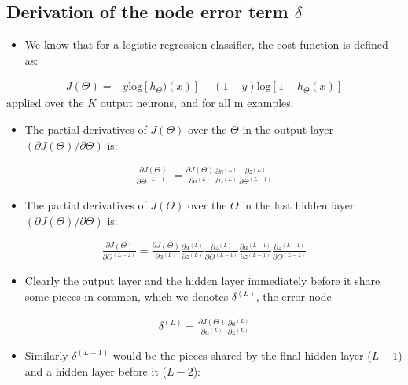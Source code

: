 \documentclass[a4paper,12pt]{report}
\begin{document}
\begin{appendices}
\section{Derivation of the node error term $\delta$}
\begin{itemize}
\item We know that for a logistic regression classifier, the cost function is defined as:
\end{itemize}
\begin{align}
J(\Theta) = -y \mathrm{log}[h_{\Theta})(x)] - (1-y)\mathrm{log}[1- h_{\Theta}(x)]
\end{align}
applied over the $K$ output neurons, and for all m examples.
\begin{itemize}
\item The partial derivatives of $J(\Theta)$ over the $\Theta$ in the output layer $(\partial J(\Theta) / \partial \Theta)$ is:
\end{itemize}
\begin{align}
\frac{\partial J(\Theta)}{\partial \Theta^{(L-1)}} = \frac{\partial J(\Theta)}{\partial a^{(L)}}\frac{\partial a^{(L)}}{\partial z^{(L)}} \frac{\partial z^{(L)}}{\partial \Theta^{(L-1)}}
\end{align}
\begin{itemize}
\item The partial derivatives of $J(\Theta)$ over the $\Theta$ in the last hidden layer $(\partial J(\Theta) / \partial \Theta)$ is:
\end{itemize}
\begin{align}
\frac{\partial J(\Theta)}{\partial \Theta^{(L-2)}} = \frac{\partial J(\Theta)}{\partial a^{(L)}}\frac{\partial a^{(L)}}{\partial z^{(L)}} \frac{\partial z^{(L)}}{\partial \Theta^{(L-1)}}\frac{\partial a^{(L-1)}}{\partial z^{(L-1)}}\frac{\partial z^{(L-1)}}{\partial \Theta^{(L-2)}}
\end{align}
\begin{itemize}
\item Clearly the output layer and the hidden layer immediately before it share some pieces in common, which we denotes $\delta ^{(L)}$, the error node
\end{itemize}
\begin{align}
\delta^{(L)} =  \frac{\partial J(\Theta)}{\partial a^{(L)}}\frac{\partial a^{(L)}}{\partial z^{(L)}}
\end{align}
\begin{itemize}
\item Similarly $\delta ^{(L-1)}$ would be the pieces shared by the final hidden layer ($L-1$) and a hidden layer before it ($L-2$):

\end{itemize}
\end{appendices}
\end{document}
